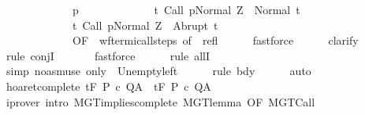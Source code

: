 \begin{isabellebody}
\ \ \ \ \ \ \ \ \ \ \ \ \ p{\isacharcomma}\isanewline
\ \ \ \ \ \ \ \ \ \ \ \ \ {\isacharbraceleft}t{\isachardot}\ {\isasymGamma}{\isasymturnstile}{\isasymlangle}Call\ p{\isacharcomma}Normal\ Z{\isasymrangle}\ {\isasymRightarrow}\ Normal\ t{\isacharbraceright}{\isacharcomma}\isanewline
\ \ \ \ \ \ \ \ \ \ \ \ \ {\isacharbraceleft}t{\isachardot}\ {\isasymGamma}{\isasymturnstile}{\isasymlangle}Call\ p{\isacharcomma}Normal\ Z{\isasymrangle}\ {\isasymRightarrow}\ Abrupt\ t{\isacharbraceright}{\isacharparenright}{\isacharbraceright}{\isacharparenright}{\isachardoublequoteclose}{\isacharcomma}\ \isanewline
\ \ \ \ \ \ \ \ \ \ \ \ \ OF\ {\isacharunderscore}\ wf{\isacharunderscore}termi{\isacharunderscore}call{\isacharunderscore}steps\ {\isacharbrackleft}of\ {\isasymGamma}{\isacharbrackright}\ refl{\isacharbrackright}{\isacharparenright}\isanewline
\ \ \ \ \isamarkupfalse%
\ fastforce\isanewline
\ \ \ \ \isamarkupfalse%
\ clarify\isanewline
\ \ \ \ \isamarkupfalse%
\ {\isacharparenleft}rule\ conjI{\isacharparenright}\isanewline
\ \ \ \ \isamarkupfalse%
\ \ fastforce\isanewline
\ \ \ \ \isamarkupfalse%
\ {\isacharparenleft}rule\ allI{\isacharparenright}\isanewline
\ \ \ \ \isamarkupfalse%
\ {\isacharparenleft}simp\ {\isacharparenleft}no{\isacharunderscore}asm{\isacharunderscore}use{\isacharparenright}\ only\ {\isacharcolon}\ Un{\isacharunderscore}empty{\isacharunderscore}left{\isacharparenright}\isanewline
\ \ \ \ \isamarkupfalse%
\ {\isacharparenleft}rule\ bdy{\isacharparenright}\isanewline
\ \ \ \ \isamarkupfalse%
\ auto\isanewline
\ \ \ \ \isamarkupfalse%
\isanewline
{}\isamarkupfalse%
%
\endisatagproof
{\isafoldproof}%
%
\isadelimproof
\isanewline
%
\endisadelimproof
\isanewline
\isanewline
{}\isamarkupfalse%
\ hoaret{\isacharunderscore}complete{\isacharcolon}\ {\isachardoublequoteopen}{\isasymGamma}{\isasymTurnstile}\isactrlsub t\isactrlbsub {\isacharslash}F\isactrlesub \ P\ c\ Q{\isacharcomma}A\ {\isasymLongrightarrow}\ {\isasymGamma}{\isacharcomma}{\isacharbraceleft}{\isacharbraceright}{\isasymturnstile}\isactrlsub t\isactrlbsub {\isacharslash}F\isactrlesub \ P\ c\ Q{\isacharcomma}A{\isachardoublequoteclose}\isanewline
%
\isadelimproof
\ \ %
\endisadelimproof
%
\isatagproof
{}\isamarkupfalse%
\ {\isacharparenleft}iprover\ intro{\isacharcolon}\ MGT{\isacharunderscore}implies{\isacharunderscore}complete\ MGT{\isacharunderscore}lemma\ {\isacharbrackleft}OF\ MGT{\isacharunderscore}Call{\isacharbrackright}{\isacharparenright}%

\end{isabellebody}
